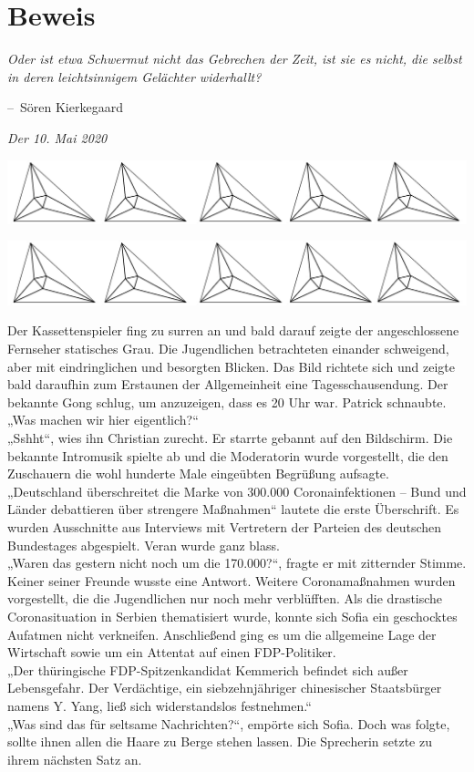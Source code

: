\documentclass[oneside]{memoir}
\makeatletter
\newcommand{\parasep}{
\bigskip
\bigskip
\begin{center} 
   \includegraphics[scale=.08]{parasep5.jpg} 
\end{center}
\bigskip
\bigskip
}
\newenvironment{chapquote}[2][2em]
  {\setlength{\@tempdima}{#1}%
   \def\chapquote@author{#2}%
   \parshape 1 \@tempdima \dimexpr\textwidth-2\@tempdima\relax%
   \itshape}
  {\par\normalfont\hfill--\ \chapquote@author\hspace*{\@tempdima}\par\bigskip}
\makeatother
\begin{document}
\chapter{Beweis} %
\begin{chapquote}{Sören Kierkegaard}
\glqq Oder ist etwa Schwermut nicht das Gebrechen der Zeit, ist sie es nicht, die selbst in deren leichtsinnigem Gelächter widerhallt?\grqq
\end{chapquote}

\textit{Der 10. Mai 2020} \\
     
\parasep

     
\parasep

Der Kassettenspieler fing zu surren an und bald darauf zeigte der angeschlossene Fernseher statisches Grau. Die Jugendlichen betrachteten einander schweigend, aber mit eindringlichen und besorgten Blicken. Das Bild richtete sich und zeigte bald daraufhin zum Erstaunen der Allgemeinheit eine Tagesschausendung. Der bekannte Gong schlug, um anzuzeigen, dass es 20 Uhr war. Patrick schnaubte.
„Was machen wir hier eigentlich?“ \\
„Sshht“, wies ihn Christian zurecht. Er starrte gebannt auf den Bildschirm. Die bekannte Intromusik spielte ab und die Moderatorin wurde vorgestellt, die den Zuschauern die wohl hunderte Male eingeübten Begrüßung aufsagte. \\
„Deutschland überschreitet die Marke von 300.000 Coronainfektionen – Bund und Länder debattieren über strengere Maßnahmen“ lautete die erste Überschrift. Es wurden Ausschnitte aus Interviews mit Vertretern der Parteien des deutschen Bundestages abgespielt. Veran wurde ganz blass. \\
„Waren das gestern nicht noch um die 170.000?“, fragte er mit zitternder Stimme. Keiner seiner Freunde wusste eine Antwort. Weitere Coronamaßnahmen wurden vorgestellt, die die Jugendlichen nur noch mehr verblüfften. Als die drastische Coronasituation in Serbien thematisiert wurde, konnte sich Sofia ein geschocktes Aufatmen nicht verkneifen. Anschließend ging es um die allgemeine Lage der Wirtschaft sowie um ein Attentat auf einen FDP-Politiker. \\
„Der thüringische FDP-Spitzenkandidat Kemmerich befindet sich außer Lebensgefahr. Der Verdächtige, ein siebzehnjähriger chinesischer Staatsbürger namens Y. Yang, ließ sich widerstandslos festnehmen.“ \\
„Was sind das für seltsame Nachrichten?“, empörte sich Sofia. Doch was folgte, sollte ihnen allen die Haare zu Berge stehen lassen. Die Sprecherin setzte zu ihrem nächsten Satz an. \\
\end{document}
